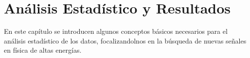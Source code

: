 \chapter{Análisis Estadístico y Resultados}

En este capítulo se introducen algunos conceptos básicos necesarios
para el análisis estadístico de los datos, focalizandolnos en la
búsqueda de nuevas se\~nales en física de altas energías.











